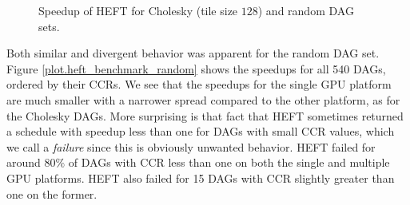 \documentclass[runningheads]{llncs}
\begin{document}
\begin{figure}
	\centering	
	\caption{Speedup of HEFT for Cholesky (tile size $128$) and random DAG sets.}	
	\label{plot.heft_benchmark}
\end{figure}

Both similar and divergent behavior was apparent for the random DAG set. Figure \ref{plot.heft_benchmark_random} shows the speedups for all 540 DAGs, ordered by their CCRs. We see that the speedups for the single GPU platform are much smaller with a narrower spread compared to the other platform, as for the Cholesky DAGs. More surprising is that fact that HEFT sometimes returned a schedule with speedup less than one for DAGs with small CCR values, which we call a {\em failure} since this is obviously unwanted behavior. HEFT failed for around $80\%$ of DAGs with CCR less than one on both the single and multiple GPU platforms. HEFT also failed for 15 DAGs with CCR slightly greater than one on the former. 
\end{document}
